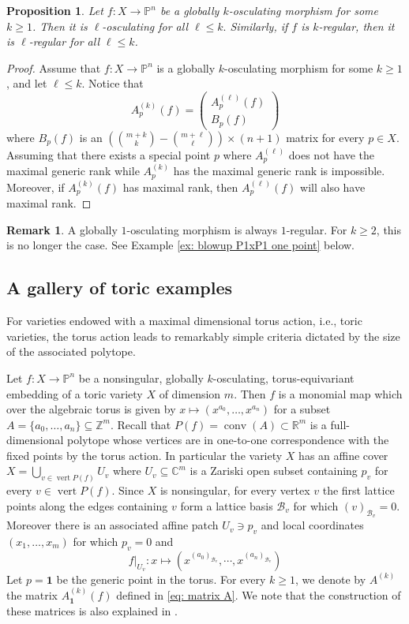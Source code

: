 \documentclass[11pt,reqno]{amsart}
\numberwithin{equation}{section}
\theoremstyle{plain}
\numberwithin{theorem}{section}
\newtheorem{proposition}[theorem]{Proposition}
\theoremstyle{definition}
\newtheorem{remark}[theorem]{Remark}
\renewcommand{\P}{\mathbb{P}}
\newcommand{\Z}{\mathbb{Z}}
\newcommand{\R}{\mathbb{R}}
\newcommand{\C}{\mathbb{C}}
\newcommand{\BB}{\mathcal{B}}
\def\bone{{\boldsymbol{1}}}
\newcommand{\conv}{\operatorname{conv}}
\newcommand{\vertices}{\operatorname{vert}}
\begin{document}
\begin{proposition}
Let $f\colon X\to\P^n$ be a globally $k$-osculating morphism for some $k\ge 1$. Then it is $\ell$-osculating for all $\ell\le k.$
Similarly, if $f$ is $k$-regular, then it is $\ell$-regular for all $\ell\le k$.
\end{proposition}
\begin{proof}
Assume that $f\colon X\to\P^n$ is a globally $k$-osculating morphism for some $k\ge 1$, and let $\ell\le k$. Notice that   
\[
A_p^{(k)}(f) = 
\begin{pmatrix}
A_p^{(\ell)}(f) \\ B_p(f)
\end{pmatrix}
\]
where $B_p(f)$ is an $\left(\binom{m+k}{k}-\binom{m+\ell}{\ell}\right)\times (n+1)$ matrix for every $p\in X$. Assuming that there exists a special point $p$ where $A_p^{(\ell)}$ does not have the maximal generic rank while $A_p^{(k)}$ has the maximal generic rank is impossible.
Moreover, if $A_p^{(k)}(f)$ has maximal rank, then $A_p^{(\ell)}(f)$ will also have maximal rank.
\end{proof}

\begin{remark}
A globally $1$-osculating morphism is always $1$-regular. For $k\ge 2$, this is no longer the case. See Example \ref{ex: blowup P1xP1 one point} below.
\end{remark}





\subsection{A gallery of toric examples}\label{subsec: gallery of toric examples}

For varieties endowed with a maximal dimensional torus action, i.e., toric varieties, the torus action leads to remarkably simple criteria dictated by the size of the associated polytope.

Let $f\colon X\to\P^n$ be a nonsingular, globally $k$-osculating, torus-equivariant embedding of a toric variety $X$ of dimension $m$. 
Then $f$ is a monomial map which over the algebraic torus is given by $x\mapsto (x^{a_0},\dots,x^{a_n})$ for a subset $A=\{a_0,\dots,a_n\}\subseteq\Z^m$.
Recall that $P(f)=\conv(A)\subset\R^m$ is a full-dimensional polytope whose vertices are in one-to-one correspondence with the fixed points by the torus action. In particular the variety $X$ has an affine cover $X=\bigcup_{v\in\vertices P(f)} U_v$ where $U_v\subseteq\C^m$ is a Zariski open subset containing $p_v$ for every $v\in\vertices P(f)$. Since $X$ is nonsingular, for every vertex $v$ the first lattice points along the edges containing $v$ form a lattice basis $\BB_v$ for which $(v)_{\BB_v}=0$. Moreover there is an associated affine patch $U_v\ni p_v$ and local coordinates $(x_1,\dots,x_m)$ for which $p_v=0$ and 
\[
f|_{U_v}\colon x\mapsto (x^{(a_0)_{\BB_v}},\cdots,x^{(a_n)_{\BB_v}})
\]
Let $p=\bone$ be the generic point in the torus.
For every $k\ge 1$, we denote by $A^{(k)}$ the matrix $A_{\bone}^{(k)}(f)$ defined in \eqref{eq: matrix A}. We note that the construction of these matrices is also explained in \cite[Section 2.3]{dickenstein2024interpolation}.
\end{document}
